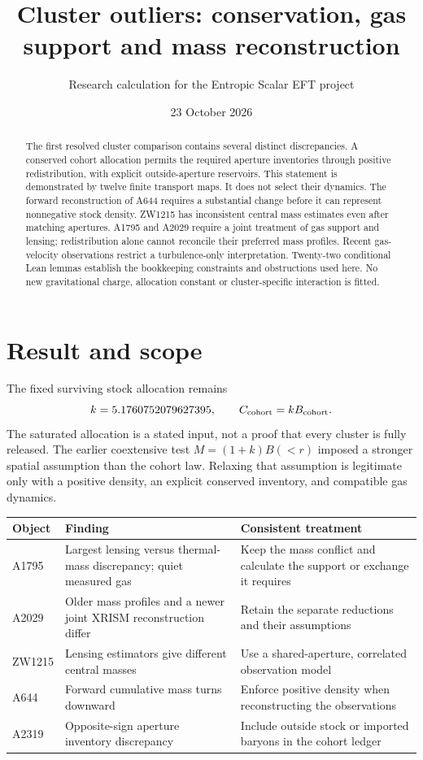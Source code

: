 \documentclass[11pt]{article}
\title{Cluster outliers: conservation, gas support and mass reconstruction}
\author{Research calculation for the Entropic Scalar EFT project}
\date{23 October 2026}
\begin{document}
\maketitle
\begin{abstract}
The first resolved cluster comparison contains several distinct discrepancies. A conserved cohort allocation permits the required aperture inventories through positive redistribution, with explicit outside-aperture reservoirs. This statement is demonstrated by twelve finite transport maps. It does not select their dynamics. The forward reconstruction of A644 requires a substantial change before it can represent nonnegative stock density. ZW1215 has inconsistent central mass estimates even after matching apertures. A1795 and A2029 require a joint treatment of gas support and lensing; redistribution alone cannot reconcile their preferred mass profiles. Recent gas-velocity observations restrict a turbulence-only interpretation. Twenty-two conditional Lean lemmas establish the bookkeeping constraints and obstructions used here. No new gravitational charge, allocation constant or cluster-specific interaction is fitted.
\end{abstract}

\section{Result and scope}
The fixed surviving stock allocation remains
\[
k=5.1760752079627395,\qquad C_{\rm cohort}=kB_{\rm cohort}.
\]
The saturated allocation is a stated input, not a proof that every cluster is fully released. The earlier coextensive test $M=(1+k)B(<r)$ imposed a stronger spatial assumption than the cohort law. Relaxing that assumption is legitimate only with a positive density, an explicit conserved inventory, and compatible gas dynamics.

\begin{center}\small
\begin{tabularx}{\linewidth}{lXX}
\toprule
Object & Finding & Consistent treatment\\
\midrule
A1795 & Largest lensing versus thermal-mass discrepancy; quiet measured gas & Keep the mass conflict and calculate the support or exchange it requires\\
A2029 & Older mass profiles and a newer joint XRISM reconstruction differ & Retain the separate reductions and their assumptions\\
ZW1215 & Lensing estimators give different central masses & Use a shared-aperture, correlated observation model\\
A644 & Forward cumulative mass turns downward & Enforce positive density when reconstructing the observations\\
A2319 & Opposite-sign aperture inventory discrepancy & Include outside stock or imported baryons in the cohort ledger\\
\bottomrule
\end{tabularx}
\end{center}
\end{document}
